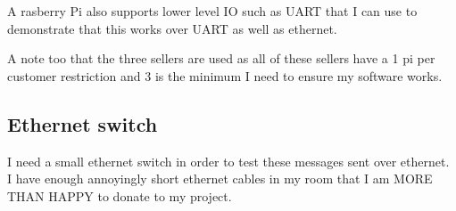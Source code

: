 \documentclass[11pt]{article}
\begin{document}
A rasberry Pi also supports lower level IO such as UART that I can use to demonstrate that this works over
UART as well as ethernet.

A note too that the three sellers are used as all of these sellers have a 1 pi per customer restriction and
3 is the minimum I need to ensure my software works.

\subsection{Ethernet switch}
I need a small ethernet switch in order to test these messages sent over ethernet. I have enough annoyingly short
ethernet cables in my room that I am MORE THAN HAPPY to donate to my project.
\end{document}
